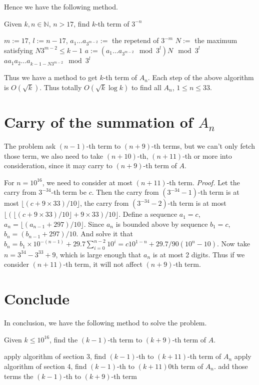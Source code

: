 \documentclass[paper=a4]{scrartcl}
\begin{document}
Hence we have the following method.
\begin{tcolorbox}[arc=0pt,colback=white,title={Algorithm}]
Given $k,n\in\mathbb{N}$, $n>17$, find $k$-th term of $3^{-n}$
\tcblower
\begin{algorithmic}
\STATE $m:=17$, $l:=n-17$, $a_1\ldots a_{3^{m-2}}:=$ the repetend of $3^{-m}$
\STATE $N:=$ the maximum satisfying $N3^{m-2}\leq k-1$
\STATE $a:=(a_1\ldots a_{3^{m-2}}\mod 3^l)N\mod 3^l$
\RETURN $aa_1a_2\ldots a_{k-1-N3^{m-2}}\mod 3^l$
\end{algorithmic}
\end{tcolorbox}
Thus we have a method to get $k$-th term of $A_n$. Each step of the above algorithm is $O(\sqrt k)$. Thus totally $O(\sqrt k\log k)$ to find all $A_n$, $1\leq n\leq 33$.

\section{Carry of the summation of $A_n$}
The problem ask $(n-1)$-th term to $(n+9)$-th terms, but we can't only fetch those term, we also need to take $(n+10)$-th, $(n+11)$-th or more into consideration, since it may carry to $(n+9)$-th term of $A$.
\begin{tcolorbox}[arc=0pt,colback=white,title={Property}]
For $n=10^{16}$, we need to consider at most $(n+11)$-th term.
\tcblower \textit{Proof.} Let the carry from $3^{-34}$-th term be $c$. Then the carry from $(3^{-34}-1)$-th term is at most $\lfloor (c+9\times 33)/10\rfloor$, the carry from $(3^{-34}-2)$-th term is at most $\lfloor(\lfloor(c+9\times 33)/10\rfloor+9\times 33)/10\rfloor$. Define a sequence $a_1=c$, $a_n=\lfloor(a_{n-1}+297)/10\rfloor$. Since $a_n$ is bounded above by sequence $b_1=c$, $b_n=(b_{n-1}+297)/10$. And solve it that $b_n=b_1\times 10^{-(n-1)}+29.7\sum_{i=0}^{n-2}10^{i}=c10^{1-n}+29.7/90(10^n-10)$. Now take $n=3^{34}-3^{33}+9$, which is large enough that $a_n$ is at most 2 digits. Thus if we consider $(n+11)$-th term, it will not affect $(n+9)$-th term.
\end{tcolorbox}

\section{Conclude}
In conclusion, we have the following method to solve the problem.
\begin{tcolorbox}[arc=0pt,colback=white,title={Algorithm}]
Given $k\leq 10^{16}$, find the $(k-1)$-th term to $(k+9)$-th term of $A$.
\tcblower
\begin{algorithmic}
		\STATE apply algorithm of section 3, find $(k-1)$-th to $(k+11)$-th term of $A_n$
	\ELSE 
		\STATE apply algorithm of section 4, find $(k-1)$-th to $(k+11)$0th term of $A_n$.
	\ENDIF
\ENDFOR
\STATE add those terms
\RETURN the $(k-1)$-th to $(k+9)$-th term
\end{algorithmic}
\end{tcolorbox}
\end{document}

